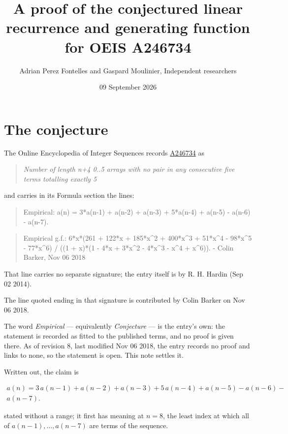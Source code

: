 \documentclass[11pt]{article}
\title{A proof of the conjectured linear recurrence and generating function for OEIS A246734}
\author{Adrian Perez Fontelles and Gaspard Moulinier, Independent researchers}
\date{09 September 2026}
\theoremstyle{definition}
\begin{document}
\maketitle
\section{The conjecture}

The Online Encyclopedia of Integer Sequences records \href{https://oeis.org/A246734}{A246734} as

\begin{quote}\itshape Number of length n+4 0..5 arrays with no pair in any consecutive five terms totalling exactly 5\end{quote}

and carries in its Formula section the lines:

\begin{quote}\ttfamily Empirical: a(n) = 3*a(n-1) + a(n-2) + a(n-3) + 5*a(n-4) + a(n-5) - a(n-6) - a(n-7).\end{quote}

\begin{quote}\ttfamily Empirical g.f.: 6*x*(261 + 122*x + 185*x\textasciicircum{}2 + 400*x\textasciicircum{}3 + 51*x\textasciicircum{}4 - 98*x\textasciicircum{}5 - 77*x\textasciicircum{}6) / ((1 + x)*(1 - 4*x + 3*x\textasciicircum{}2 - 4*x\textasciicircum{}3 - x\textasciicircum{}4 + x\textasciicircum{}6)). - Colin Barker, Nov 06 2018\end{quote}

That line carries no separate signature; the entry itself is by R. H. Hardin (Sep 02 2014).

The line quoted ending in that signature is contributed by Colin Barker on Nov 06 2018.

The word {\itshape Empirical} --- equivalently {\itshape Conjecture} --- is the entry's own: the statement is recorded as fitted to the published terms, and no proof is given there. As of revision 8, last modified Nov 06 2018, the entry records no proof and links to none, so the statement is open. This note settles it.

Written out, the claim is

\begin{multline*} a(n) = 3\,a(n-1) + a(n-2) + a(n-3) + 5\,a(n-4) + a(n-5) - a(n-6) - \\ a(n-7). \end{multline*}

stated without a range; it first has meaning at $n = 8$, the least index at which all of $a(n-1),\dots,a(n-7)$ are terms of the sequence.
\end{document}
